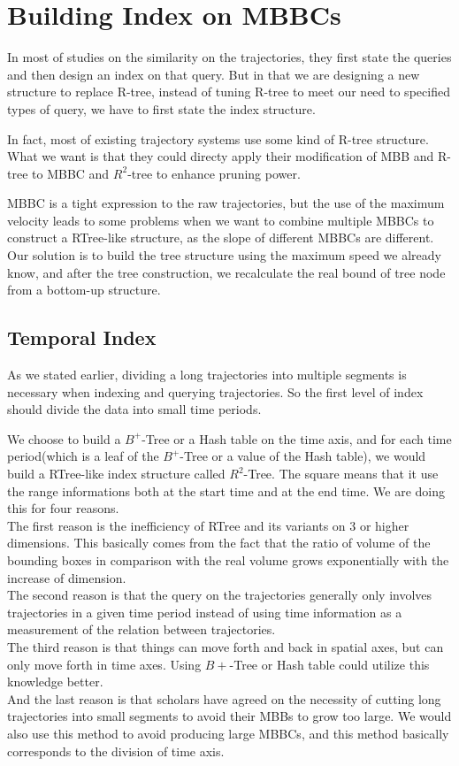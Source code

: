 \documentclass[sigplan]{acmart}
\begin{document}
\section{Building Index on MBBCs}
In most of studies on the similarity on the trajectories, they first state the queries and then design an index on that query. But in that we are designing a new structure to replace R-tree, instead of tuning R-tree to meet our need to specified types of query, we have to first state the index structure.\par
In fact, most of existing trajectory systems use some kind of R-tree structure. What we want is that they could directy apply their modification of MBB and R-tree to MBBC and $R^2$-tree to enhance pruning power.\par
MBBC is a tight expression to the raw trajectories, but the use of the maximum velocity leads to some problems when we want to combine multiple MBBCs to construct a RTree-like structure, as the slope of different MBBCs are different. Our solution is to build the tree structure using the maximum speed we already know, and after the tree construction, we recalculate the real bound of tree node from a bottom-up structure.\par
\subsection{Temporal Index}
As we stated earlier, dividing a long trajectories into multiple segments is necessary when indexing and querying trajectories. So the first level of index should divide the data into small time periods.\par
We choose to build a $B^+$-Tree or a Hash table on the time axis, and for each time period(which is a leaf of the $B^+$-Tree or a value of the Hash table), we would build a RTree-like index structure called $R^2$-Tree. The square means that it use the range informations both at the start time and at the end time. We are doing this for four reasons.\\
\indent The first reason is the inefficiency of RTree and its variants on 3 or higher dimensions. This basically comes from the fact that the ratio of volume of the bounding boxes in comparison with the real volume grows exponentially with the increase of dimension.\\
\indent The second reason is that the query on the trajectories generally only involves trajectories in a given time period instead of using time information as a measurement of the relation between trajectories.\\
\indent The third reason is that things can move forth and back in spatial axes, but can only move forth in time axes. Using $B+$-Tree or Hash table could utilize this knowledge better.\\
\indent And the last reason is that scholars have agreed on the necessity of cutting long trajectories into small segments to avoid their MBBs to grow too large. We would also use this method to avoid producing large MBBCs, and this method basically corresponds to the division of time axis.\par
\end{document}
